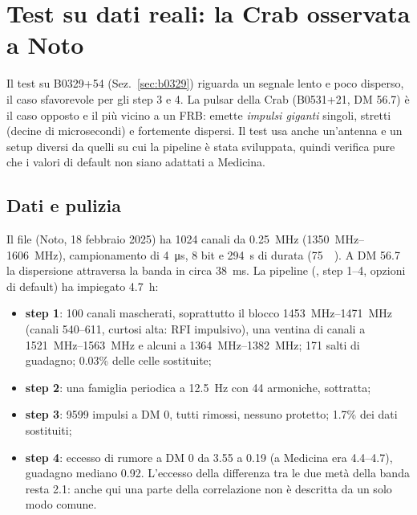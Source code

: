 \FloatBarrier
\section{Test su dati reali: la Crab osservata a Noto}
\label{sec:crabnoto}

Il test su B0329+54 (Sez.~\ref{sec:b0329}) riguarda un segnale lento e poco disperso, il caso sfavorevole per gli step 3 e
4. La pulsar della Crab (B0531+21, DM 56.7) è il caso opposto e il più vicino a un FRB: emette \emph{impulsi giganti}
singoli, stretti (decine di microsecondi) e fortemente dispersi. Il test usa anche un'antenna e un setup diversi da
quelli su cui la pipeline è stata sviluppata, quindi verifica pure che i valori di default non siano adattati a Medicina.

\subsection{Dati e pulizia}
Il file  (Noto, 18 febbraio 2025) ha 1024 canali da \SI{0.25}{\mega\hertz}
(\SIrange{1350}{1606}{\mega\hertz}), campionamento di \SI{4}{\micro\second}, 8 bit e \SI{294}{\second} di durata
(\SI{75}{\giga\byte}). A DM 56.7 la dispersione attraversa la banda in circa \SI{38}{\milli\second}. La pipeline
(, step 1--4, opzioni di default) ha impiegato \SI{4.7}{\hour}:
\begin{itemize}
  \item \textbf{step 1}: 100 canali mascherati, soprattutto il blocco \SIrange{1453}{1471}{\mega\hertz} (canali
    540--611, curtosi alta: RFI impulsivo), una ventina di canali a \SIrange{1521}{1563}{\mega\hertz} e alcuni a
    \SIrange{1364}{1382}{\mega\hertz}; 171 salti di guadagno; 0.03\% delle celle sostituite;
  \item \textbf{step 2}: una famiglia periodica a \SI{12.5}{\hertz} con 44 armoniche, sottratta;
  \item \textbf{step 3}: 9599 impulsi a DM 0, tutti rimossi, nessuno protetto; 1.7\% dei dati sostituiti;
  \item \textbf{step 4}: eccesso di rumore a DM 0 da 3.55 a 0.19 (a Medicina era 4.4--4.7), guadagno mediano 0.92.
    L'eccesso della differenza tra le due metà della banda resta 2.1: anche qui una parte della correlazione non è
    descritta da un solo modo comune.
\end{itemize}

